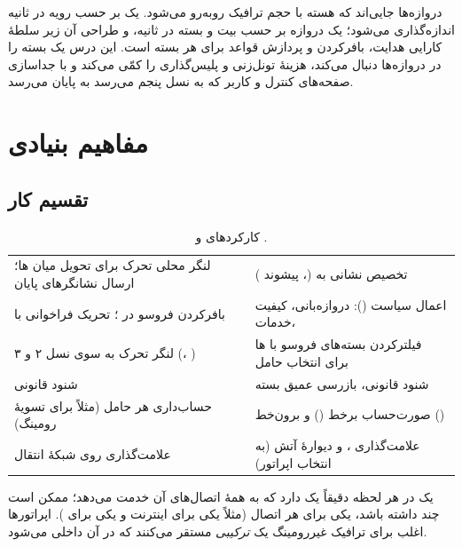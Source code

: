 \documentclass[11pt,a4paper]{article}
\begin{document}
دروازه‌ها جایی‌اند که هسته با حجم ترافیک روبه‌رو می‌شود. یک  بر حسب رویه در ثانیه اندازه‌گذاری می‌شود؛ یک دروازه
بر حسب بیت و بسته در ثانیه، و طراحی آن زیر سلطهٔ کارایی هدایت، بافرکردن و پردازش قواعد برای هر بسته است. این درس یک
بسته را در دروازه‌ها دنبال می‌کند، هزینهٔ تونل‌زنی و پلیس‌گذاری را کمّی می‌کند و با جداسازی صفحه‌های کنترل و کاربر که به
 نسل پنجم می‌رسد به پایان می‌رسد.

\section{مفاهیم بنیادی}

\subsection{تقسیم کار}
\begin{table}[htbp]
\centering\small
\caption{کارکردهای  و  \cite{ts23401}.}\label{tab:roles}
\begin{tabularx}{\linewidth}{@{}Y Y@{}}
\toprule
{} &  \\
\midrule
لنگر محلی تحرک برای تحویل میان ها؛ ارسال نشانگرهای پایان & تخصیص نشانی  به  (، پیشوند ) \\
بافرکردن فروسو در ؛ تحریک فراخوانی با  & اعمال سیاست (): دروازه‌بانی، کیفیت خدمات،  \\
لنگر تحرک به سوی نسل ۲ و ۳ (، ) & فیلترکردن بسته‌های فروسو با ها برای انتخاب حامل \\
شنود قانونی & شنود قانونی، بازرسی عمیق بسته \\
حساب‌داری هر حامل (مثلاً برای تسویهٔ رومینگ) & صورت‌حساب برخط () و برون‌خط () \\
علامت‌گذاری  روی شبکهٔ انتقال & علامت‌گذاری ،  و دیوارهٔ آتش (به انتخاب اپراتور) \\
\bottomrule
\end{tabularx}
\end{table}

یک  در هر لحظه دقیقاً یک  دارد که به همهٔ اتصال‌های  آن خدمت می‌دهد؛ ممکن است چند 
داشته باشد، یکی برای هر اتصال  (مثلاً یکی برای  اینترنت و یکی برای ). اپراتورها اغلب برای
ترافیک غیررومینگ یک \emph{ ترکیبی} مستقر می‌کنند که در آن  داخلی می‌شود.
\end{document}

